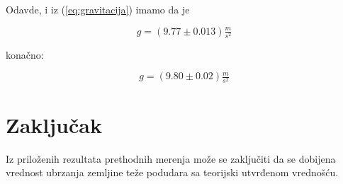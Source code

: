 \documentclass[a4paper]{article}
\begin{document}
Odavde, i iz (\ref{eq:gravitacija}) imamo da je

\begin{equation}
    g = (9.77 \pm 0.013) \tfrac{m}{s^2}
\end{equation}

konačno:

\begin{equation}
    \boxed{
      g = (9.80 \pm 0.02) \tfrac{m}{s^2}
    }
\end{equation}

\section{Zaključak}

Iz priloženih rezultata prethodnih merenja može se zaključiti da se dobijena vrednost ubrzanja zemljine teže podudara sa teorijski utvrđenom vrednošću.
\end{document}
